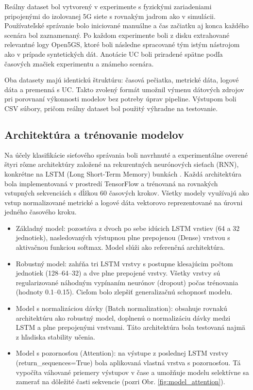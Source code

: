 \documentclass[a4paper,10pt]{ieeetran}
\begin{document}
Reálny dataset bol vytvorený v experimente s fyzickými zariadeniami pripojenými do izolovanej 5G siete s rovnakým jadrom ako v simulácii. Používateľské správanie bolo iniciované manuálne a čas začiatku aj konca každého scenára bol zaznamenaný. Po každom experimente boli z disku extrahované relevantné logy Open5GS, ktoré boli následne spracované tým istým nástrojom ako v prípade syntetických dát. Anotácie UC boli priradené spätne podľa časových značiek experimentu a známeho scenára.

Oba datasety majú identickú štruktúru: časová pečiatka, metrické dáta, logové dáta a premenná s UC. Takto zvolený formát umožnil výmenu dátových zdrojov pri porovnaní výkonnosti modelov bez potreby úprav pipeline. Výstupom boli CSV súbory, pričom reálny dataset bol použitý výhradne na testovanie.

\subsection{Architektúra a trénovanie modelov}
\label{subsec2}

Na účely klasifikácie sieťového správania boli navrhnuté a experimentálne overené štyri rôzne architektúry založené na rekurentných neurónových sieťach (RNN), konkrétne na LSTM (Long Short-Term Memory) bunkách \cite{lstm}. Každá architektúra bola implementovaná v prostredí TensorFlow a trénovaná na rovnakých vstupných sekvenciách s dĺžkou 60 časových krokov. Všetky modely využívajú ako vstup normalizované metrické a logové dáta vektorovo reprezentované na úrovni jedného časového kroku.

\begin{itemize}
\item Základný model: pozostáva z dvoch po sebe idúcich LSTM vrstiev (64 a 32 jednotiek), nasledovaných výstupnou plne prepojenou (Dense) vrstvou s aktivačnou funkciou softmax. Model slúži ako referenčná architektúra.
\item Robustný model: zahŕňa tri LSTM vrstvy s postupne klesajúcim počtom jednotiek (128–64–32) a dve plne prepojené vrstvy. Všetky vrstvy sú regularizované náhodným vypínaním neurónov (dropout) počas trénovania (hodnoty 0.1–0.15). Cieľom bolo zlepšiť generalizačnú schopnosť modelu.
\item Model s normalizáciou dávky (Batch normalization): obsahuje rovnakú architektúru ako robustný model, doplnenú o normalizáciu dávky medzi LSTM a plne prepojenými vrstvami. Táto architektúra bola testovaná najmä z hľadiska stability učenia.
\item Model s pozornosťou (Attention): na výstupe z poslednej LSTM vrstvy (return\_sequences=True) bola aplikovaná vlastná vrstva s pozornosťou. Tá vypočíta váhované priemery výstupov v čase a umožňuje modelu selektívne sa zamerať na dôležité časti sekvencie (pozri Obr. \ref{fig:model_attention}).
\end{itemize}
\end{document}
